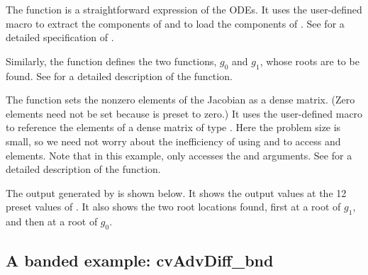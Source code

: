 The function  is a straightforward expression of the ODEs. 
It uses the user-defined macro  to extract the components of 
and to load the components of .
See  for a detailed specification of .

Similarly, the function  defines the two functions, $g_0$ and $g_1$,
whose roots are to be found.  See  for a detailed description
of the  function.

The function  sets the nonzero elements of the Jacobian as a
dense matrix.  (Zero elements need not be set because  is preset
to zero.)  It uses the user-defined macro  to reference the
elements of a dense matrix of type {\sunmatrix}.  Here the problem
size is small, so we need not worry about the inefficiency of using
 and  to access  and
{\sunmatdense} elements.  Note that in this example, 
only accesses the  and  arguments.  See 
for a detailed description of the  function.

The output generated by  is shown below.  It shows the output
values at the 12 preset values of .  It also shows the two root
locations found, first at a root of $g_1$, and then at a root of $g_0$.



\subsection{A banded example: cvAdvDiff\_bnd}\label{ss:cvAdvDiff}

